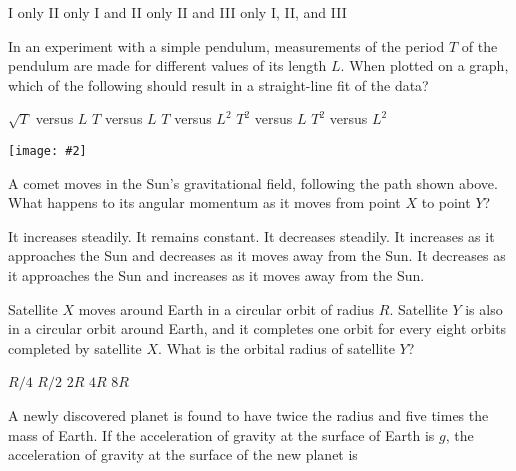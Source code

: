 \documentclass[12pt]{../../oss-classkick-exam}
\newcommand{\pic}[2]{\texttt{[image: \#2]}}
\begin{document}
\begin{questions}
  \begin{oneparchoices}
    \choice I only
    \choice II only
    \choice I and II only
    \choice II and III only
    \choice I, II, and III
  \end{oneparchoices}
  \vspace{.3in}
  \newpage
  
  \question In an experiment with a simple pendulum, measurements of the period
  $T$ of the pendulum are made for different values of its length $L$.
  When plotted on a graph, which of the following should result in a
  straight-line fit of the data?

  \begin{oneparchoices}
    \choice $\sqrt{T}$ versus $L$
    \choice $T$ versus $L$
    \choice $T$ versus $L^2$
    \choice $T^2$ versus $L$
    \choice $T^2$ versus $L^2$
  \end{oneparchoices}
  \vspace{.3in}
  
  \begin{center}
    \vspace{-.3in} 
    \pic{.15}{comet}
  \end{center}
  \question A comet moves in the Sun's gravitational field, following the path
  shown above. What happens to its angular momentum as it moves from point $X$
  to point $Y$?
  \begin{choices}
    \choice It increases steadily.
    \choice It remains constant.
    \choice It decreases steadily.
    \choice It increases as it approaches the Sun and decreases as it moves
    away from the Sun.
    \choice It decreases as it approaches the Sun and increases as it moves
    away from the Sun.
  \end{choices}
  \vspace{.7in}

  \question Satellite $X$ moves around Earth in a circular orbit of radius $R$.
  Satellite $Y$ is also in a circular orbit around Earth, and it completes one
  orbit for every eight orbits completed by satellite $X$. What is the
  orbital radius of satellite $Y$?

  \begin{oneparchoices}
    \choice $R/4$
    \choice $R/2$
    \choice $2R$
    \choice $4R$
    \choice $8R$
  \end{oneparchoices}
  \vspace{.3in}
  
  \question A newly discovered planet is found to have twice the radius and five
  times the mass of Earth. If the acceleration of gravity at the surface of
  Earth is $g$, the acceleration of gravity at the surface of the new planet is


\end{questions}
\end{document}
